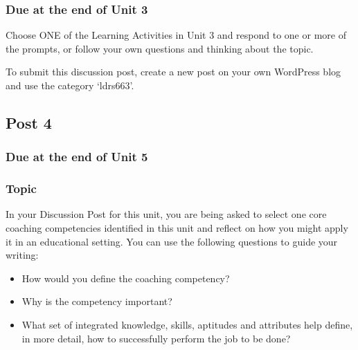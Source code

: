 \documentclass[
]{book}
\providecommand{\tightlist}{%
  \setlength{\itemsep}{0pt}\setlength{\parskip}{0pt}}
\begin{document}
\hypertarget{due-at-the-end-of-unit-3}{%
\subsubsection*{Due at the end of Unit 3}\label{due-at-the-end-of-unit-3}}

Choose ONE of the Learning Activities in Unit 3 and respond to one or more of the prompts, or follow your own questions and thinking about the topic.

To submit this discussion post, create a new post on your own WordPress blog and use the category `ldrs663'.

\hypertarget{post-4}{%
\subsection*{Post 4}\label{post-4}}

\hypertarget{due-at-the-end-of-unit-5}{%
\subsubsection*{Due at the end of Unit 5}\label{due-at-the-end-of-unit-5}}

\hypertarget{topic-1}{%
\subsubsection*{Topic}\label{topic-1}}

In your Discussion Post for this unit, you are being asked to select one core coaching competencies identified in this unit and reflect on how you might apply it in an educational setting. You can use the following questions to guide your writing:

\begin{itemize}
\tightlist
\item
  How would you define the coaching competency?\\
\item
  Why is the competency important?\\
\item
  What set of integrated knowledge, skills, aptitudes and attributes help define, in more detail, how to successfully perform the job to be done?
\end{itemize}
\end{document}
